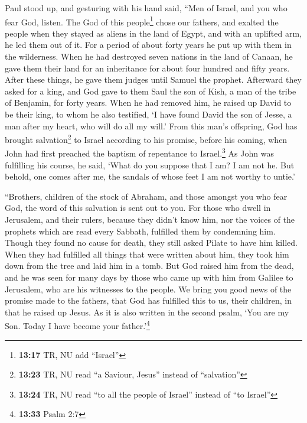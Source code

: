  Paul stood up, and gesturing with his hand said, ``Men
of Israel, and you who fear God, listen.  The God of this
people\footnote{\textbf{13:17} TR, NU add ``Israel''} chose our fathers,
and exalted the people when they stayed as aliens in the land of Egypt,
and with an uplifted arm, he led them out of it.  For a
period of about forty years he put up with them in the wilderness.
 When he had destroyed seven nations in the land of
Canaan, he gave them their land for an inheritance for about four
hundred and fifty years.  After these things, he gave
them judges until Samuel the prophet.  Afterward they
asked for a king, and God gave to them Saul the son of Kish, a man of
the tribe of Benjamin, for forty years.  When he had
removed him, he raised up David to be their king, to whom he also
testified, `I have found David the son of Jesse, a man after my heart,
who will do all my will.'  From this man's offspring, God
has brought salvation\footnote{\textbf{13:23} TR, NU read ``a Saviour,
  Jesus'' instead of ``salvation''} to Israel according to his promise,
 before his coming, when John had first preached the
baptism of repentance to Israel.\footnote{\textbf{13:24} TR, NU read
  ``to all the people of Israel'' instead of ``to Israel''}
 As John was fulfilling his course, he said, `What do you
suppose that I am? I am not he. But behold, one comes after me, the
sandals of whose feet I am not worthy to untie.'

 ``Brothers, children of the stock of Abraham, and those
amongst you who fear God, the word of this salvation is sent out to you.
 For those who dwell in Jerusalem, and their rulers,
because they didn't know him, nor the voices of the prophets which are
read every Sabbath, fulfilled them by condemning him. 
Though they found no cause for death, they still asked Pilate to have
him killed.  When they had fulfilled all things that were
written about him, they took him down from the tree and laid him in a
tomb.  But God raised him from the dead, 
and he was seen for many days by those who came up with him from Galilee
to Jerusalem, who are his witnesses to the people.  We
bring you good news of the promise made to the fathers, 
that God has fulfilled this to us, their children, in that he raised up
Jesus. As it is also written in the second psalm, `You are my Son. Today
I have become your father.'\footnote{\textbf{13:33} Psalm 2:7}

